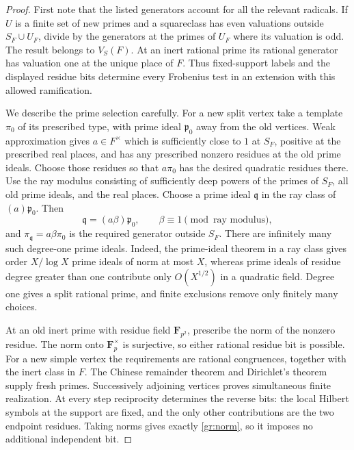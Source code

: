 \begin{proof}
First note that the listed generators account for all the relevant radicals.
If $U$ is a finite set of new primes and a squareclass has even valuations
outside $S_F\cup U_F$, divide by the generators at the primes of $U_F$
where its valuation is odd.  The result belongs to $V_S(F)$.  At an inert
rational prime its rational generator has valuation one at the unique place
of $F$.  Thus fixed-support labels and the displayed residue bits determine
every Frobenius test in an extension with this allowed ramification.

We describe the prime selection carefully.  For a new split vertex take a
template $\pi_0$ of its prescribed type, with prime ideal
$\mathfrak p_0$ away from the old vertices.  Weak approximation gives
$a\in F^\times$ which is sufficiently close to $1$ at $S_F$, positive at
the prescribed real places, and has any prescribed nonzero residues at the
old prime ideals.  Choose those residues so that $a\pi_0$ has the desired
quadratic residues there.  Use the ray modulus consisting of sufficiently
deep powers of the primes of $S_F$, all old prime ideals, and the real
places.  Choose a prime ideal $\mathfrak q$ in the ray class of
$(a)\mathfrak p_0$.  Then
\[
 \mathfrak q=(a\beta)\mathfrak p_0,
 \qquad \beta\equiv1\pmod{\text{ray modulus}},
\]
and $\pi_{\mathfrak q}=a\beta\pi_0$ is the required generator outside $S_F$.
There are infinitely many such degree-one prime ideals.  Indeed, the
prime-ideal theorem in a ray class gives order $X/\log X$ prime ideals of
norm at most $X$, whereas prime ideals of residue degree greater than one
contribute only $O(X^{1/2})$ in a quadratic field.  Degree one gives a split
rational prime, and finite exclusions remove only finitely many choices.

At an old inert prime with residue field $\mathbf F_{p^2}$, prescribe the
norm of the nonzero residue.  The norm onto $\mathbf F_p^\times$ is
surjective, so either rational residue bit is possible.  For a new simple
vertex the requirements are rational congruences, together with the inert
class in $F$.  The Chinese remainder theorem and Dirichlet's theorem supply
fresh primes.  Successively adjoining vertices proves simultaneous finite
realization.  At every step reciprocity determines the reverse bits:
the local Hilbert symbols at the support are fixed, and the only other
contributions are the two endpoint residues.  Taking norms gives exactly
\eqref{gr:norm}, so it imposes no additional independent bit.


\end{proof}
